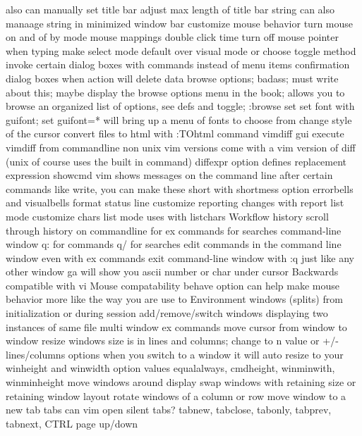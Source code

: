 \documentclass[12pt]{book}
\begin{document}
{{      also can manually set title bar
      adjust max length of title bar string
      can also manaage string in minimized window bar
    customize mouse behavior
      turn mouse on and of by mode
      mouse mappings
      double click time
      turn off mouse pointer when typing
    make select mode default over visual mode or choose toggle method
    invoke certain dialog boxes with commands instead of menu items
    confirmation dialog boxes when action will delete data
    browse options; badass; must write about this; maybe display the browse options menu in the book; allows you to browse an organized list of options, see defs and toggle; :browse set
    set font with guifont; set guifont=* will bring up a menu of fonts to choose from
    change style of the cursor
  convert files to html with :TOhtml command
  vimdiff gui
    execute vimdiff from commandline
    non unix vim versions come with a vim version of diff (unix of course uses the built in command)
    diffexpr option defines replacement expression
  showcmd
  vim shows messages on the command line after certain commands like write, you can make these short with shortmess option
  errorbells and visualbells
  format status line
    customize reporting changes with report
  list mode
    customize chars list mode uses with listchars
Workflow
  history
    scroll through history on commandline
      for ex commands
      for searches
    command-line window
      q: for commands
      q/ for searches
      edit commands in the command line window even with ex commands
      exit command-line window with :q just like any other window
  ga will show you ascii number or char under cursor
  Backwards compatible with vi
  Mouse compatability
    behave option can help make mouse behavior more like the way you are use to
  Environment
    windows (splits)
      from initialization or during session
      add/remove/switch windows
      displaying two instances of same file
      multi window ex commands
      move cursor from window to window
      resize windows
        size is in lines and columns; change to n value or +/- lines/columns
        options
          when you switch to a window it will auto resize to your winheight and winwidth option values
          equalalways, cmdheight, winminwith, winminheight
      move windows around display
        swap windows with retaining size or retaining window layout
        rotate windows of a column or row
        move window to a new tab
      tabs
        can vim open silent tabs?
        tabnew, tabclose, tabonly, tabprev, tabnext, CTRL page up/down
}}
\end{document}
